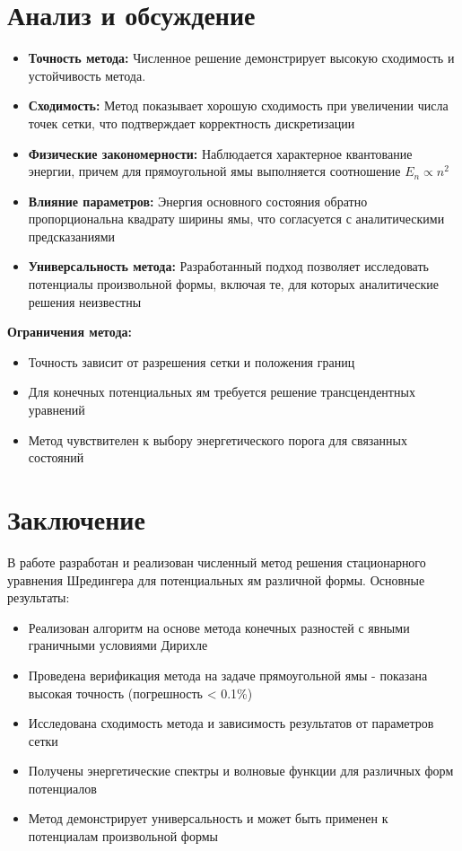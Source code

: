 \documentclass[12pt,a4paper]{article}
\begin{document}
\section{Анализ и обсуждение}
\begin{itemize}
\item \textbf{Точность метода:} Численное решение демонстрирует высокую сходимость и устойчивость метода.

\item \textbf{Сходимость:} Метод показывает хорошую сходимость при увеличении числа точек сетки, что подтверждает корректность дискретизации

\item \textbf{Физические закономерности:} Наблюдается характерное квантование энергии, причем для прямоугольной ямы выполняется соотношение $E_n \propto n^2$

\item \textbf{Влияние параметров:} Энергия основного состояния обратно пропорциональна квадрату ширины ямы, что согласуется с аналитическими предсказаниями

\item \textbf{Универсальность метода:} Разработанный подход позволяет исследовать потенциалы произвольной формы, включая те, для которых аналитические решения неизвестны
\end{itemize}

\textbf{Ограничения метода:} 
\begin{itemize}
\item Точность зависит от разрешения сетки и положения границ
\item Для конечных потенциальных ям требуется решение трансцендентных уравнений
\item Метод чувствителен к выбору энергетического порога для связанных состояний
\end{itemize}

\section{Заключение}
В работе разработан и реализован численный метод решения стационарного уравнения Шредингера для потенциальных ям различной формы. Основные результаты:

\begin{itemize}
\item Реализован алгоритм на основе метода конечных разностей с явными граничными условиями Дирихле
\item Проведена верификация метода на задаче прямоугольной ямы - показана высокая точность (погрешность < 0.1\%)
\item Исследована сходимость метода и зависимость результатов от параметров сетки
\item Получены энергетические спектры и волновые функции для различных форм потенциалов
\item Метод демонстрирует универсальность и может быть применен к потенциалам произвольной формы
\end{itemize}
\end{document}
